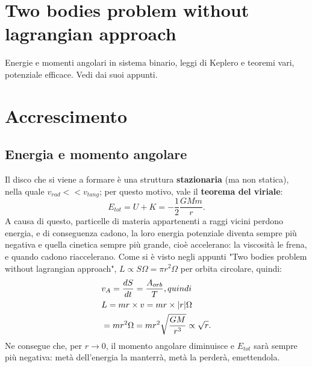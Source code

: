 % 
% 
% 
% 

\section{Two bodies problem without lagrangian approach}
Energie e momenti angolari in sistema binario, leggi di Keplero e teoremi vari, potenziale efficace. Vedi dai suoi appunti.



\section{Accrescimento}

\subsection{Energia e momento angolare}
Il disco che si viene a formare è una struttura \textbf{stazionaria} (ma non statica), nella quale $v_{rad}<<v_{tang} $; per questo motivo, vale il \textbf{teorema del viriale}:
\begin{equation}
    E_{tot} = U + K = -\frac{1}{2}\frac{GMm}{r}.
\end{equation}
A causa di questo, particelle di materia appartenenti a raggi vicini perdono energia, e di conseguenza cadono, la loro energia potenziale diventa sempre più negativa e quella cinetica sempre più grande, cioè accelerano: la viscosità le frena, e quando cadono riaccelerano.
Come si è visto negli appunti "Two bodies problem without lagrangian approach", $L\propto S \Omega = \pi r^2 \Omega$ per orbita circolare, quindi:
\begin{align}
    &v_A = \frac{dS}{dt} = \frac{A_{orb}}{T}, quindi\notag\\ 
    &L = mr\times v = mr\times |r|\Omega\notag\\
    &= mr^2\Omega =mr^2\sqrt{\frac{GM}{r^3}} \propto \sqrt{r}.
\end{align}
Ne consegue che, per $r\xrightarrow{} 0$, il momento angolare diminuisce e $E_{tot}$ sarà sempre più negativa: metà dell'energia la manterrà, metà la perderà, emettendola.

